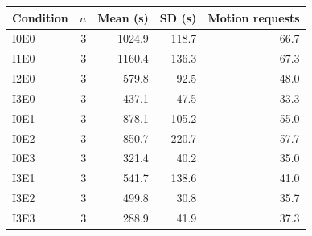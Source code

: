 \begin{tabular}{lrrrr}\toprule
Condition & $n$ & Mean (s) & SD (s) & Motion requests \\ \midrule
I0E0 & 3 & 1024.9 & 118.7 & 66.7 \\
I1E0 & 3 & 1160.4 & 136.3 & 67.3 \\
I2E0 & 3 & 579.8 & 92.5 & 48.0 \\
I3E0 & 3 & 437.1 & 47.5 & 33.3 \\
I0E1 & 3 & 878.1 & 105.2 & 55.0 \\
I0E2 & 3 & 850.7 & 220.7 & 57.7 \\
I0E3 & 3 & 321.4 & 40.2 & 35.0 \\
I3E1 & 3 & 541.7 & 138.6 & 41.0 \\
I3E2 & 3 & 499.8 & 30.8 & 35.7 \\
I3E3 & 3 & 288.9 & 41.9 & 37.3 \\
\bottomrule\end{tabular}
